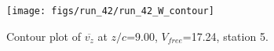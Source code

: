 \begin{figure}[H]
\centering
\texttt{[image: figs/run\_42/run\_42\_W\_contour]}
\caption{Contour plot of $\overline{v_{z}}$ at $z/c$=9.00, $V_{free}$=17.24, station 5.}
\label{fig:run_42_W_contour}
\end{figure}



